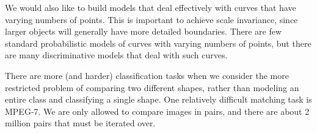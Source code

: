 We would also like to build models that deal effectively with curves
that have varying numbers of points. This is important to achieve
scale invariance, since larger objects will generally have more
detailed boundaries. There are few standard probabilistic models of
curves with varying numbers of points, but there are many
discriminative models that deal with such curves.

There are more (and harder) classification tasks when we consider the
more restricted problem of comparing two different shapes, rather than
modeling an entire class and classifying a single shape. One
relatively difficult matching task is MPEG-7. We are only allowed to
compare images in pairs, and there are about 2 million pairs that must
be iterated over.


